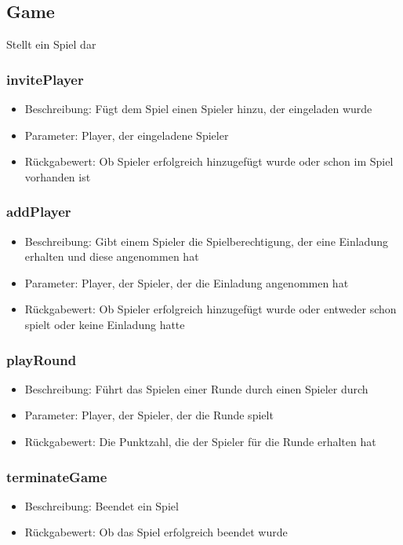 \documentclass[a4paper]{scrreprt}
\begin{document}
   \subsection{Game}
   Stellt ein Spiel dar
   \subsubsection{invitePlayer}
   \begin{itemize}
           \item Beschreibung: Fügt dem Spiel einen Spieler hinzu, der eingeladen wurde
           \item Parameter: Player, der eingeladene Spieler
           \item Rückgabewert: Ob Spieler erfolgreich hinzugefügt wurde oder schon im Spiel vorhanden ist
   \end{itemize}
   \subsubsection{addPlayer}
   \begin{itemize}
              \item Beschreibung: Gibt einem Spieler die Spielberechtigung, der eine Einladung erhalten und diese angenommen hat
              \item Parameter: Player, der Spieler, der die Einladung angenommen hat
              \item Rückgabewert: Ob Spieler erfolgreich hinzugefügt wurde oder entweder schon spielt oder keine Einladung hatte
   \end{itemize}
   \subsubsection{playRound}
   \begin{itemize}
              \item Beschreibung: Führt das Spielen einer Runde durch einen Spieler durch
              \item Parameter: Player, der Spieler, der die Runde spielt
              \item Rückgabewert: Die Punktzahl, die der Spieler für die Runde erhalten hat
   \end{itemize}
   \subsubsection{terminateGame}
   \begin{itemize}
           \item Beschreibung: Beendet ein Spiel
           \item Rückgabewert: Ob das Spiel erfolgreich beendet wurde
   \end{itemize}
\end{document}
